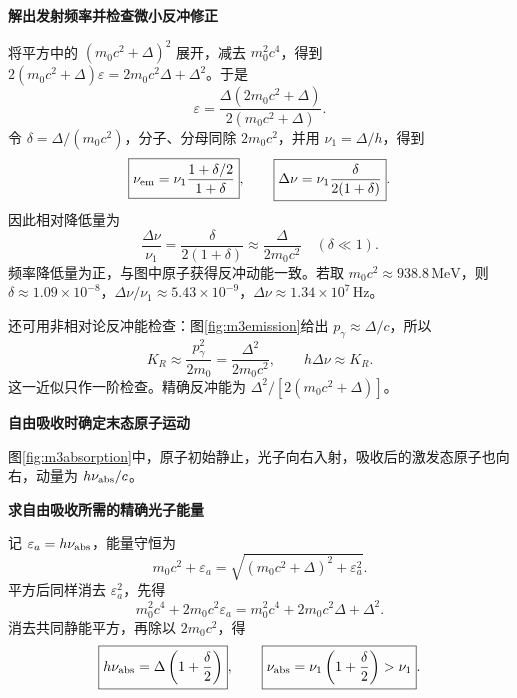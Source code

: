 \begin{solution}
\par\medskip{}\noindent\textbf{解出发射频率并检查微小反冲修正}\par\nobreak
将平方中的 $(m_0c^2+\Delta)^2$ 展开，减去 $m_0^2c^4$，得到 $2(m_0c^2+\Delta)\varepsilon=2m_0c^2\Delta+\Delta^2$。于是
\[
 \varepsilon=\frac{\Delta(2m_0c^2+\Delta)}{2(m_0c^2+\Delta)}.
\]
令 \(\delta=\Delta/(m_0c^2)\)，分子、分母同除 $2m_0c^2$，并用 $\nu_1=\Delta/h$，得到
\[
 \boxed{\nu_{\rm em}=\nu_1\frac{1+\delta/2}{1+\delta}},\qquad
 \boxed{\Delta\nu=\nu_1\frac{\delta}{2(1+\delta)}}.
\]
因此相对降低量为
\[
 \boxed{\frac{\Delta\nu}{\nu_1}=\frac{\delta}{2(1+\delta)}
       \approx\frac{\Delta}{2m_0c^2}}\quad(\delta\ll1).
\]
频率降低量为正，与图中原子获得反冲动能一致。若取 \(m_0c^2\approx938.8\,\mathrm{MeV}\)，则 \(\delta\approx1.09\times10^{-8}\)，\(\Delta\nu/\nu_1\approx5.43\times10^{-9}\)，\(\Delta\nu\approx1.34\times10^7\,\mathrm{Hz}\)。

还可用非相对论反冲能检查：图\ref{fig:m3emission}给出 \(p_\gamma\approx\Delta/c\)，所以
\[
 K_R\approx\frac{p_\gamma^2}{2m_0}=\frac{\Delta^2}{2m_0c^2},\qquad
 h\Delta\nu\approx K_R.
\]
这一近似只作一阶检查。精确反冲能为 \(\Delta^2/[2(m_0c^2+\Delta)]\)。

 

\par\medskip{}\noindent\textbf{自由吸收时确定末态原子运动}\par\nobreak
图\ref{fig:m3absorption}中，原子初始静止，光子向右入射，吸收后的激发态原子也向右，动量为 \(h\nu_{\rm abs}/c\)。


\par\medskip{}\noindent\textbf{求自由吸收所需的精确光子能量}\par\nobreak
记 \(\varepsilon_a=h\nu_{\rm abs}\)，能量守恒为
\[
 m_0c^2+\varepsilon_a
 =\sqrt{(m_0c^2+\Delta)^2+\varepsilon_a^2}.
\]
平方后同样消去 \(\varepsilon_a^2\)，先得
\[
 m_0^2c^4+2m_0c^2\varepsilon_a
 =m_0^2c^4+2m_0c^2\Delta+\Delta^2.
\]
消去共同静能平方，再除以 $2m_0c^2$，得
\[
 \boxed{h\nu_{\rm abs}=\Delta\left(1+\frac{\delta}{2}\right)},\qquad
 \boxed{\nu_{\rm abs}=\nu_1\left(1+\frac{\delta}{2}\right)>\nu_1}.
\]



\end{solution}
